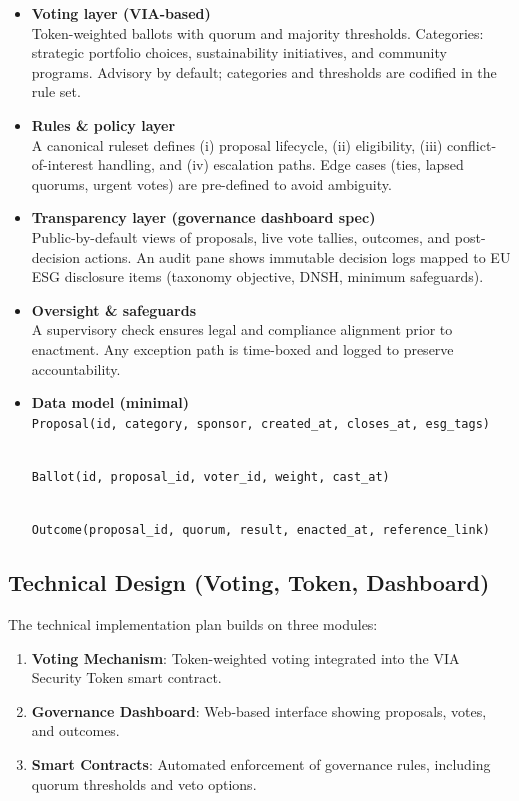 \documentclass[
  english,
  12pt,
  oneside,
  open=any]{scrbook}
\providecommand{\tightlist}{%
  \setlength{\itemsep}{0pt}\setlength{\parskip}{0pt}}\usepackage{longtable,booktabs,array}
\begin{document}
\begin{itemize}
\item
  \textbf{Voting layer (VIA-based)}\\
  Token-weighted ballots with quorum and majority thresholds.
  Categories: strategic portfolio choices, sustainability initiatives,
  and community programs. Advisory by default; categories and thresholds
  are codified in the rule set.
\item
  \textbf{Rules \& policy layer}\\
  A canonical ruleset defines (i) proposal lifecycle, (ii) eligibility,
  (iii) conflict-of-interest handling, and (iv) escalation paths. Edge
  cases (ties, lapsed quorums, urgent votes) are pre-defined to avoid
  ambiguity.
\item
  \textbf{Transparency layer (governance dashboard spec)}\\
  Public-by-default views of proposals, live vote tallies, outcomes, and
  post-decision actions. An audit pane shows immutable decision logs
  mapped to EU ESG disclosure items (taxonomy objective, DNSH, minimum
  safeguards).
\item
  \textbf{Oversight \& safeguards}\\
  A supervisory check ensures legal and compliance alignment prior to
  enactment. Any exception path is time-boxed and logged to preserve
  accountability.
\item
  \textbf{Data model (minimal)}\\
  \texttt{Proposal(id,\ category,\ sponsor,\ created\_at,\ closes\_at,\ esg\_tags)}\strut \\
  \texttt{Ballot(id,\ proposal\_id,\ voter\_id,\ weight,\ cast\_at)}\strut \\
  \texttt{Outcome(proposal\_id,\ quorum,\ result,\ enacted\_at,\ reference\_link)}
\end{itemize}

\subsection{Technical Design (Voting, Token, Dashboard)}\label{sec-tech}

The technical implementation plan builds on three modules:

\begin{enumerate}
\def\labelenumi{\arabic{enumi}.}
\tightlist
\item
  \textbf{Voting Mechanism}: Token-weighted voting integrated into the
  VIA Security Token smart contract.\\
\item
  \textbf{Governance Dashboard}: Web-based interface showing proposals,
  votes, and outcomes.\\
\item
  \textbf{Smart Contracts}: Automated enforcement of governance rules,
  including quorum thresholds and veto options.
\end{enumerate}
\end{document}
